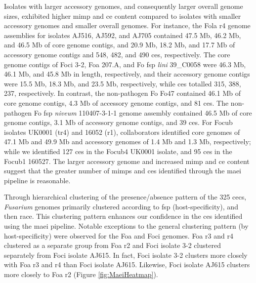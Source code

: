 Isolates with larger accessory genomes, and consequently larger overall genome sizes, exhibited higher \ac{mimp} and \ac{ce} content compared to isolates with smaller accessory genomes and smaller overall genomes. For instance, the \ac{Fola} \ac{r4} genome assemblies for isolates AJ516, AJ592, and AJ705 contained 47.5 Mb, 46.2 Mb, and 46.5 Mb of core genome contigs, and 20.9 Mb, 18.2 Mb, and 17.7 Mb of accessory genome contigs and 548, 482, and 490 \acp{ce}, respectively. The core genome contigs of \ac{Foci} 3-2, \ac{Foa} 207.A, and \ac{Fo} \ac{fsp} \textit{lini} 39\_C0058 were 46.3 Mb, 46.1 Mb, and 45.8 Mb in length, respectively, and their accessory genome contigs were 15.5 Mb, 18.3 Mb, and 23.5 Mb, respectively, while \acp{ce} totalled 315, 388, 237, respectively. In contrast, the non-pathogen \ac{Fo} Fo47 contained 46.1 Mb of core genome contigs, 4.3 Mb of accessory genome contigs, and 81 \acp{ce}. The non-pathogen \ac{Fo} \ac{fsp} \textit{niveum} 110407-3-1-1 genome assembly contained 46.5 Mb of core genome contigs, 3.1 Mb of accessory genome contigs, and 39 \acp{ce}. For \ac{Focub} isolates UK0001 (\ac{tr4}) and 16052 (\ac{r1}), collaborators identified core genomes of 47.1 Mb and 49.9 Mb and accessory genomes of 1.4 Mb and 1.3 Mb, respectively; while we identified 127 \acp{ce} in the \ac{Focub4} UK0001 isolate, and 95 \acp{ce} in the \ac{Focub1} 160527. The larger accessory genome and increased \ac{mimp} and \ac{ce} content suggest that the greater number of \acp{mimp} and \acp{ce} identified through the \ac{maei} pipeline is reasonable.

Through hierarchical clustering of the presence/absence pattern of the 325 \acp{cec}, \textit{Fusarium} genomes primarily clustered according to \ac{fsp} (host-specificity), and then race. This clustering pattern enhances our confidence in the \acp{ce} identified using the \ac{maei} pipeline. Notable exceptions to the general clustering pattern (by host-specificity) were observed for the \ac{Foa} and \ac{Foci} genomes. \ac{Foa} \ac{r3} and \ac{r4} clustered as a separate group from \ac{Foa} \ac{r2} and \ac{Foci} isolate 3-2 clustered separately from \ac{Foci} isolate AJ615. In fact, \ac{Foci} isolate 3-2 clusters more closely with \ac{Foa} \ac{r3} and \ac{r4} than \ac{Foci} isolate AJ615. Likewise, \ac{Foci} isolate AJ615 clusters more closely to \ac{Foa} \ac{r2} (Figure \ref{fig:MaeiHeatmap}). 

